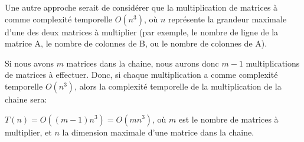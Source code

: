 \documentclass[10.9pt]{article} %
\begin{document}
Une autre approche serait de considérer que la multiplication de matrices à comme complexité temporelle $O(n^3)$, 
où $n$ représente la grandeur maximale d'une des deux matrices à multiplier (par exemple, le nombre de ligne de
la matrice A, le nombre de colonnes de B, ou le nombre de colonnes de A).

Si nous avons $m$ matrices dans la chaine, nous aurons donc $m-1$ multiplications de matrices à effectuer.
Donc, si chaque multiplication a comme complexité temporelle $O(n^3)$, alors la complexité temporelle
de la multiplication de la chaine sera:

$T(n) = O((m-1)n^3) = O(mn^3)$, où $m$ est le nombre de matrices à multiplier, et $n$ la dimension maximale
d'une matrice dans la chaine.
\end{document}
